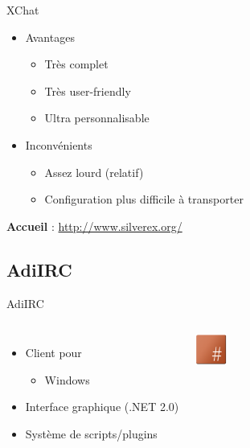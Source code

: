 \documentclass{beamer}
\begin{document}
\begin{frame}{XChat}
\begin{itemize}	
	\itemsep1.3em
		\item Avantages
		\begin{itemize}
			\item Très complet
			\item Très user-friendly
			\item Ultra personnalisable
		\end{itemize}
		\item Inconvénients
		\begin{itemize}
			\item Assez lourd (relatif)
			\item Configuration plus difficile à transporter
		\end{itemize}
\end{itemize}
\begin{center}
	\textbf{Accueil} : \url{http://www.silverex.org/}
\end{center}
\end{frame}

	\subsection{AdiIRC} %
\begin{frame}{AdiIRC}
\begin{columns}
		\begin{itemize}	
			\itemsep1.3em
				\item Client pour
				\begin{itemize}
					\item Windows
				\end{itemize}
				\item Interface graphique (.NET 2.0)
				\item Système de scripts/plugins
		\end{itemize}
		\href{https://danielsan89.deviantart.com/art/adiIRC-dock-icon-69465482}{\hspace{3cm} \includegraphics[width=0.15\textwidth]{images/adiIRC_dock_icon_by_Danielsan89.png}}
\end{columns}
\end{frame}
\end{document}
